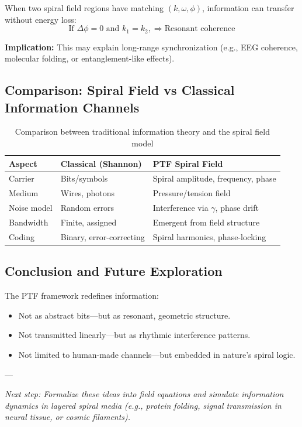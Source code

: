 \documentclass[a4paper,12pt]{article}
\begin{document}
When two spiral field regions have matching \((k, \omega, \phi)\), information can transfer without energy loss:
\[
\text{If } \Delta \phi = 0 \text{ and } k_1 = k_2, \Rightarrow \text{Resonant coherence}
\]

\textbf{Implication:}  
This may explain long-range synchronization (e.g., EEG coherence, molecular folding, or entanglement-like effects).

\subsection{Comparison: Spiral Field vs Classical Information Channels}

\begin{table}[H]
\centering
\caption{Comparison between traditional information theory and the spiral field model}
\begin{tabular}{|l|l|l|}
\hline
\textbf{Aspect} & \textbf{Classical (Shannon)} & \textbf{PTF Spiral Field} \\
\hline
Carrier & Bits/symbols & Spiral amplitude, frequency, phase \\
Medium & Wires, photons & Pressure/tension field \\
Noise model & Random errors & Interference via $\gamma$, phase drift \\
Bandwidth & Finite, assigned & Emergent from field structure \\
Coding & Binary, error-correcting & Spiral harmonics, phase-locking \\
\hline
\end{tabular}
\end{table}

\subsection{Conclusion and Future Exploration}

The PTF framework redefines information:
\begin{itemize}
    \item Not as abstract bits—but as resonant, geometric structure.
    \item Not transmitted linearly—but as rhythmic interference patterns.
    \item Not limited to human-made channels—but embedded in nature’s spiral logic.
\end{itemize}

---

\textit{Next step: Formalize these ideas into field equations and simulate information dynamics in layered spiral media (e.g., protein folding, signal transmission in neural tissue, or cosmic filaments).}
\end{document}
